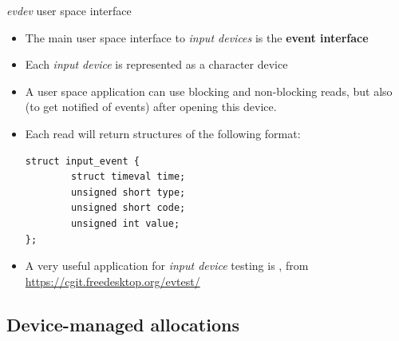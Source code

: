 \begin{frame}[fragile]{{\em evdev} user space interface}
  \begin{itemize}
  \item The main user space interface to {\em input devices} is the
    {\bf event interface}
  \item Each {\em input device} is represented as a
     character device
  \item A user space application can use blocking and non-blocking
    reads, but also  (to get notified of events) after
    opening this device.
  \item Each read will return  structures of the
    following format:
    \begin{block}{}
    \begin{verbatim}
struct input_event {
        struct timeval time;
        unsigned short type;
        unsigned short code;
        unsigned int value;
};
\end{verbatim}
\end{block}
\item A very useful application for {\em input device} testing is
  , from \url{https://cgit.freedesktop.org/evtest/}
  \end{itemize}
\end{frame}

\subsection{Device-managed allocations}

